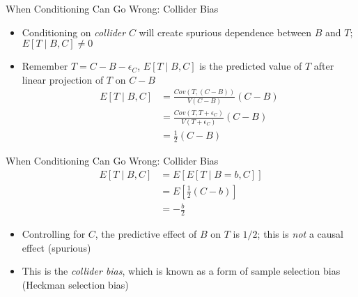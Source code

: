 \documentclass[aspectratio=1610,12pt,xcolor=dvipsnames]{beamer}
\begin{document}
\begin{frame}{When Conditioning Can Go Wrong: Collider Bias}
\begin{itemize}
    \item Conditioning on \textit{collider} $C$ will create spurious dependence between $B$ and $T$;
    $E[T \mid B, C] \neq 0$
    \item Remember $T = C - B - \epsilon_C$, $E[T \mid B, C]$ is the predicted value of $T$ after linear projection of $T$ on $C-B$
    \begin{align*}
        E[T \mid B, C] &= \frac{Cov(T, (C-B))}{V(C-B)} (C-B) \\
        &= \frac{Cov(T,T+\epsilon_C)}{V(T+\epsilon_C)} (C-B) \\
        &= \frac{1}{2}(C-B)
    \end{align*}
\end{itemize}
\end{frame}

\begin{frame}{When Conditioning Can Go Wrong: Collider Bias}
    \begin{align*}
        E[T \mid B, C] &= E\left[E[T \mid B=b, C]\right] \\ 
        &= E\left[\frac{1}{2} (C-b) \right] \\
        &= -\frac{b}{2}
    \end{align*}

    \begin{itemize}
    \item Controlling for $C$, the predictive effect of $B$ on $T$ is $1/2$; this is \textit{not} a causal effect (spurious)
    \item This is the \textit{collider bias}, which is known as a form of sample selection bias (Heckman selection bias)
    \end{itemize}
\end{frame}
\end{document}
